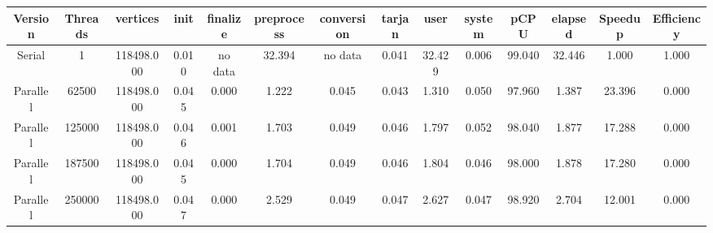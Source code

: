 \begin{tabular}{|c|c|c|c|c|c|c|c|c|c|c|c|c|c|}
\toprule
 Version &  Threads &   vertices &  init & finalize &  preprocess & conversion &  tarjan &   user &  system &   pCPU &  elapsed &  Speedup &  Efficiency \\
\midrule
  Serial &        1 & 118498.000 & 0.010 &  no data &      32.394 &    no data &   0.041 & 32.429 &   0.006 & 99.040 &   32.446 &    1.000 &       1.000 \\
Parallel &    62500 & 118498.000 & 0.045 &    0.000 &       1.222 &      0.045 &   0.043 &  1.310 &   0.050 & 97.960 &    1.387 &   23.396 &       0.000 \\
Parallel &   125000 & 118498.000 & 0.046 &    0.001 &       1.703 &      0.049 &   0.046 &  1.797 &   0.052 & 98.040 &    1.877 &   17.288 &       0.000 \\
Parallel &   187500 & 118498.000 & 0.045 &    0.000 &       1.704 &      0.049 &   0.046 &  1.804 &   0.046 & 98.000 &    1.878 &   17.280 &       0.000 \\
Parallel &   250000 & 118498.000 & 0.047 &    0.000 &       2.529 &      0.049 &   0.047 &  2.627 &   0.047 & 98.920 &    2.704 &   12.001 &       0.000 \\
\bottomrule
\end{tabular}
